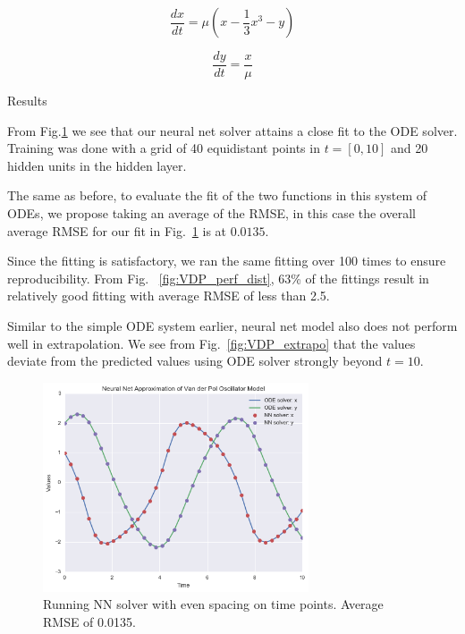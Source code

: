 \documentclass[11pt]{article}
\begin{document}
     \begin{equation}
      \frac{dx}{dt} = \mu(x - \frac{1}{3}x^3 - y)
      \label{eq:VDP1}
    \end{equation}
    
     \begin{equation}
      \frac{dy}{dt} = \frac{x}{\mu}
      \label{eq:VDP2}
    \end{equation}
    
Results

From Fig.\ref{fig:VDP_uniform} we see that our neural net solver attains a close fit to the ODE solver. Training was done with a grid of 40 equidistant points in $t = [0, 10]$ and 20 hidden units in the hidden layer. 

The same as before, to evaluate the fit of the two functions in this system of ODEs, we propose taking an average of the RMSE, in this case the overall average RMSE for our fit in Fig.~\ref{fig:VDP_uniform} is at $0.0135$. 

Since the fitting is satisfactory, we ran the same fitting over 100 times to ensure reproducibility. From Fig. ~\ref{fig:VDP_perf_dist}, 63\% of the fittings result in relatively good fitting with average RMSE of less than 2.5.

Similar to the simple ODE system earlier, neural net model also does not perform well in extrapolation. We see from Fig.~\ref{fig:VDP_extrapo} that the values deviate from the predicted values using ODE solver strongly beyond $t = 10$.

\begin{figure}
\centering
\includegraphics[width=0.7\textwidth]{VDP_uniform_good.png}
      \caption{Running NN solver with even spacing on time points. Average RMSE of 0.0135. \label{fig:VDP_uniform}}
\end{figure}
\end{document}
